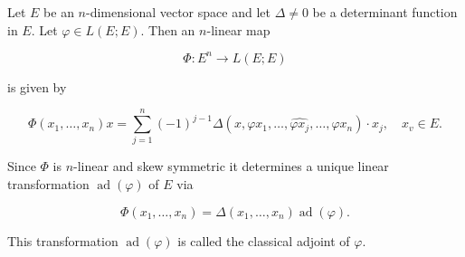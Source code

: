 Let $E$ be an $n$-dimensional vector space and let $\Delta \neq 0$ be a determinant function in $E$. Let $\varphi \in L(E; E)$. Then an $n$-linear map

$$\Phi: E^n \to L(E; E)$$

is given by

$$\Phi(x_1, \ldots, x_n) x = \sum_{j=1}^{n} (-1)^{j-1} \Delta(x, \varphi x_1, \ldots, \widehat{\varphi x_j}, \ldots, \varphi x_n) \cdot x_j, \quad x_v \in E.$$

Since $\Phi$ is $n$-linear and skew symmetric it determines a unique linear transformation $\operatorname{ad}(\varphi)$ of $E$ via

$$\Phi(x_1, \ldots, x_n) = \Delta(x_1, \ldots, x_n) \operatorname{ad}(\varphi).$$

This transformation $\operatorname{ad}(\varphi)$ is called the classical adjoint of $\varphi$.
